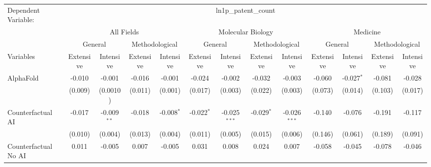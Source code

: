 \begingroup
\centering
\begin{tabular}{lcccccccccccc}
   \tabularnewline \midrule \midrule
   Dependent Variable: & \multicolumn{12}{c}{ln1p\_patent\_count}\\
 & \multicolumn{4}{c}{All Fields} & \multicolumn{4}{c}{Molecular Biology} & \multicolumn{4}{c}{Medicine} \\
\cmidrule(lr){2-5} \cmidrule(lr){6-9} \cmidrule(lr){10-13}
 & \multicolumn{2}{c}{General} & \multicolumn{2}{c}{Methodological} & \multicolumn{2}{c}{General} & \multicolumn{2}{c}{Methodological} & \multicolumn{2}{c}{General} & \multicolumn{2}{c}{Methodological} \\
\cmidrule(lr){2-3} \cmidrule(lr){4-5} \cmidrule(lr){6-7} \cmidrule(lr){8-9} \cmidrule(lr){10-11} \cmidrule(lr){12-13}
Variables & \multicolumn{1}{c}{Extensive} & \multicolumn{1}{c}{Intensive} & \multicolumn{1}{c}{Extensive} & \multicolumn{1}{c}{Intensive} & \multicolumn{1}{c}{Extensive} & \multicolumn{1}{c}{Intensive} & \multicolumn{1}{c}{Extensive} & \multicolumn{1}{c}{Intensive} & \multicolumn{1}{c}{Extensive} & \multicolumn{1}{c}{Intensive} & \multicolumn{1}{c}{Extensive} & \multicolumn{1}{c}{Intensive} \\
\cmidrule(lr){1-1}\cmidrule(lr){2-2} \cmidrule(lr){3-3} \cmidrule(lr){4-4} \cmidrule(lr){5-5} \cmidrule(lr){6-6} \cmidrule(lr){7-7} \cmidrule(lr){8-8} \cmidrule(lr){9-9} \cmidrule(lr){10-10} \cmidrule(lr){11-11} \cmidrule(lr){12-12} \cmidrule(lr){13-13}
   AlphaFold                                & -0.010        & -0.001        & -0.016  & -0.001       & -0.024       & -0.002         & -0.032       & -0.003         & -0.060  & -0.027$^{*}$ & -0.081  & -0.028\\   
                                            & (0.009)       & (0.0010)      & (0.011) & (0.001)      & (0.017)      & (0.003)        & (0.022)      & (0.003)        & (0.073) & (0.014)      & (0.103) & (0.017)\\   
   Counterfactual AI                        & -0.017        & -0.009$^{**}$ & -0.018  & -0.008$^{*}$ & -0.022$^{*}$ & -0.025$^{***}$ & -0.029$^{*}$ & -0.026$^{***}$ & -0.140  & -0.076       & -0.191  & -0.117\\   
                                            & (0.010)       & (0.004)       & (0.013) & (0.004)      & (0.011)      & (0.005)        & (0.015)      & (0.006)        & (0.146) & (0.061)      & (0.189) & (0.091)\\   
   Counterfactual No AI                     & 0.011         & -0.005        & 0.007   & -0.005       & 0.031        & 0.008          & 0.024        & 0.007          & -0.058  & -0.045       & -0.078  & -0.046\\   

\end{tabular}
